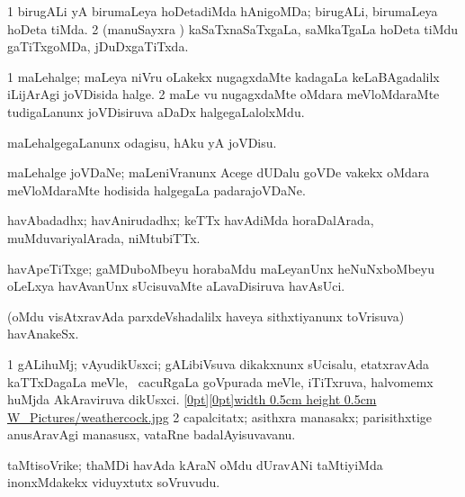 {\bentry
{} 
\gl{\gu}
\expl{}
\bmng
\bnum
\num{1} birugALi yA birumaLeya hoDetadiMda hAnigoMDa; birugALi, birumaLeya hoDeta tiMda. 
\num{2} (manuSayxra \vi) kaSaTxnaSaTxgaLa, saMkaTgaLa hoDeta tiMdu gaTiTxgoMDa, jDuDxgaTiTxda. 
\enum
\emng
\eentry

\bentry
{} 
\gl{\nA}
\expl{}
\bmng
\bnum
\num{1} maLehalge; maLeya niVru oLakekx nugagxdaMte kadagaLa keLaBAgadalilx iLijArAgi joVDisida halge. 
\num{2} maLe \mo vu nugagxdaMte oMdara meVloMdaraMte tudigaLanunx joVDisiruva aDaDx halgegaLalolxMdu. 
\enum
\emng
\eentry

\bentry
{} 
\gl{\sakirx}
\expl{}
\bmng
maLehalgegaLanunx odagisu, hAku yA joVDisu. 
\emng
\eentry

\bentry
{} 
\gl{\nA}
\expl{}
\bmng
maLehalge joVDaNe; maLeniVranunx Acege dUDalu goVDe \mo vakekx oMdara meVloMdaraMte hodisida halgegaLa padarajoVDaNe. 
\emng
\eentry

\bentry
{} 
\gl{\gu}
\expl{}
\bmng
havAbadadhx; havAnirudadhx; keTTx havAdiMda horaDalArada, muMduvariyalArada, niMtubiTTx. 
\emng
\eentry

\bentry
{} 
\gl{\nA}
\expl{}
\bmng
havApeTiTxge; gaMDuboMbeyu horabaMdu maLeyanUnx heNuNxboMbeyu oLeLxya havAvanUnx sUcisuvaMte aLavaDisiruva havAsUci. 
\emng
\eentry

\bentry
{} 
\gl{\nA}
\expl{}
\bmng
(oMdu visAtxravAda parxdeVshadalilx haveya sithxtiyanunx toVrisuva) havAnakeSx. 
\emng
\eentry

{} 
\gl{\nA}
\expl{}
\bmng
\bnum
\num{1} gALihuMj; vAyudikUsxci; gALibiVsuva dikakxnunx sUcisalu, etatxravAda kaTTxDagaLa meVle, \kanmu\ cacuRgaLa goVpurada meVle, iTiTxruva, halvomemx huMjda AkAraviruva dikUsxci. \quad \hyperlink{weathercockfigure}{\raisebox{-0.15cm}[0pt][0pt]{\pdfimage width 0.5cm height 0.5cm {W_Pictures/weathercock.jpg}}} 
\num{2} capalcitatx; asithxra manasakx; parisithxtige anusAravAgi manasusx, vataRne badalAyisuvavanu. 
\enum
\emng
\eentry

\bentry
{} 
\gl{\nA}
\expl{}
\bmng
taMtisoVrike; thaMDi havAda kAraN oMdu dUravANi taMtiyiMda inonxMdakekx viduyxtutx soVruvudu. 
\emng
\eentry

}
